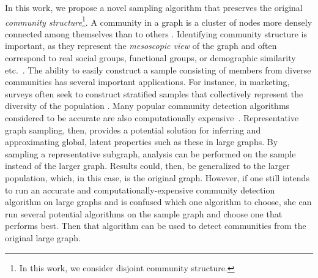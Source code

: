 In this work, we propose a novel sampling algorithm that preserves the original {\em community structure}\footnote{In this work, we consider disjoint community structure.}. A community in a graph
is a cluster of nodes more densely connected among themselves than to others \cite{wasserman1994social}. Identifying community structure is important, as they represent the {\em mesoscopic view} of the graph and often correspond to real social groups, functional groups, or demographic similarity etc.~\cite{girvan2002community}. The ability to easily construct a sample consisting of members from diverse communities has several important applications. For instance, in marketing, surveys often seek to construct stratified
samples that collectively represent the diversity of the population \cite{Kolaczyk:2009}. Many popular community detection algorithms considered to be accurate are also computationally expensive~\cite{danon2005comparing,fortunato2010community}. Representative graph sampling, then, provides a potential solution for inferring and approximating global, latent properties such as these in large graphs. By sampling a representative subgraph, analysis can be performed on the sample instead of the larger graph. Results could, then, be generalized
to the larger population, which, in this case, is the original graph. However, if one still intends to run an accurate and computationally-expensive community detection algorithm on large graphs
and is confused which one algorithm to choose, she can run several potential algorithms on the sample graph and choose one that performs best. Then that algorithm can be used to detect communities from the original large graph.

